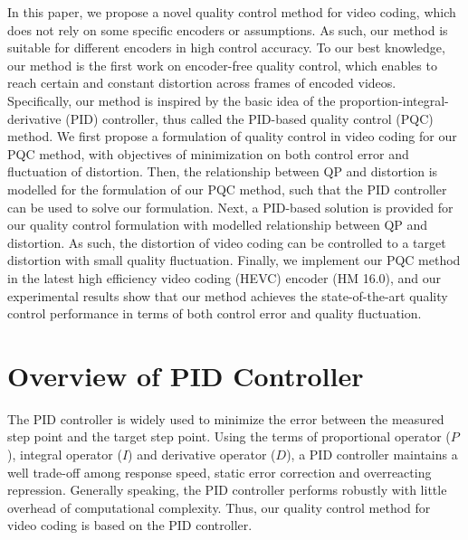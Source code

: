 \documentclass[smallabstract,smallcaptions]{dccpaper}
\begin{document}
In this paper, we propose a novel quality control method for video coding, which does not rely on some specific encoders or assumptions. As such, our method is suitable for different encoders in high control accuracy. To our best knowledge, our method is the first work on encoder-free quality control, which enables to reach certain and constant distortion across frames of encoded videos. Specifically, our method is inspired by the basic idea of the proportion-integral-derivative (PID) controller, thus called the PID-based quality control (PQC) method. We first propose a formulation of quality control in video coding for our PQC method, with objectives of minimization on both control error and fluctuation of distortion. Then, the relationship between QP and distortion is modelled for the formulation of our PQC method, such that the PID controller can be used to solve our formulation. Next, a PID-based solution is provided for our quality control formulation with modelled relationship between $\mathrm{QP}$ and distortion. As such, the distortion of video coding can be controlled to a target distortion with small quality fluctuation. Finally, we implement our PQC method in the latest high efficiency video coding (HEVC) encoder (HM 16.0), and our experimental results show that our method achieves the state-of-the-art quality control performance in terms of both control error and quality fluctuation.

\vspace{-1.0em}
\section{Overview of PID Controller}\label{pid-overview}
\vspace{-1.0em}
The PID controller\cite{ang2005pid} is widely used to minimize the error between the measured step point and the target step point. Using the terms of proportional operator ($P$), integral operator ($I$) and derivative operator ($D$), a PID controller maintains a well trade-off among response speed, static error correction and overreacting repression. Generally speaking, the PID controller performs robustly with little overhead of computational complexity. Thus, our quality control method for video coding is based on the PID controller.
\end{document}
